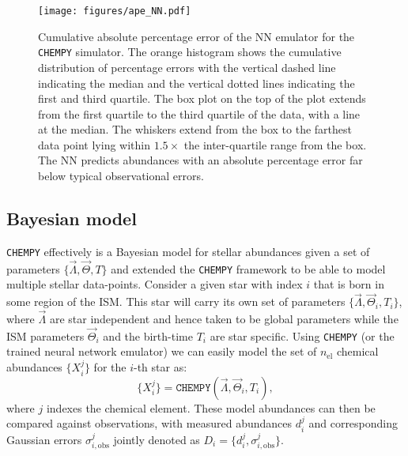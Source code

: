 \documentclass{aa}
\begin{document}
\begin{figure}[]
     \centering
     \texttt{[image: figures/ape\_NN.pdf]}
     \vspace{-.5cm}
     \caption{Cumulative absolute percentage error of the NN emulator for the \texttt{CHEMPY} simulator. The orange histogram shows the cumulative distribution of percentage errors with the vertical dashed line indicating the median and the vertical dotted lines indicating the first and third quartile. The box plot on the top of the plot extends from the first quartile to the third quartile of the data, with a line at the median. The whiskers extend from the box to the farthest data point lying within $1.5\times$ the inter-quartile range from the box. The NN predicts abundances with an absolute percentage error far below typical observational errors.}
     \label{fig:ape_NN}
\end{figure}


\subsection{Bayesian model}
\label{subsec:bayesian-model}
\texttt{CHEMPY} effectively is a Bayesian model for stellar abundances given a set of parameters $\{\Vec{\Lambda},\Vec{\Theta},T\}$ and \citet{Philcox_2019} extended the \texttt{CHEMPY} framework to be able to model multiple stellar data-points. Consider a given star with index $i$ that is born in some region of the ISM. This star will carry its own set of parameters $\{\Vec{\Lambda},\Vec{\Theta}_i,T_i\}$, where $\Vec{\Lambda}$ are star independent and hence taken to be global parameters while the ISM parameters $\Vec{\Theta}_i$ and the birth-time $T_i$ are star specific. Using \texttt{CHEMPY} (or the trained neural network emulator) we can easily model the set of $n_\mathrm{el}$ chemical abundances $\{X_i^j\}$ for the $i$-th star as: 
\begin{equation}\label{eq:chempy_function}
\{X_i^j\} = \texttt{CHEMPY}(\Vec{\Lambda},\Vec{\Theta}_i,T_i),
\end{equation}
where $j$ indexes the chemical element. 
These model abundances can then be compared against observations, with measured abundances $d_i^j$ and corresponding Gaussian errors $\sigma_{i,\mathrm{obs}}^j$ jointly denoted as $D_i=\{d_i^j,\sigma_{i,\mathrm{obs}}^j\}$.
\end{document}
